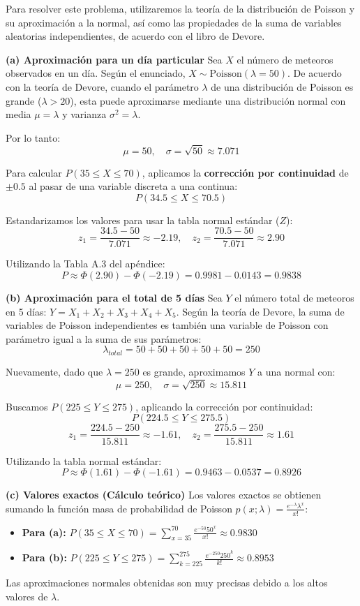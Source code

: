 \documentclass[a4paper]{article}
\begin{document}
Para resolver este problema, utilizaremos la teoría de la distribución de Poisson y su aproximación a la normal, así como las propiedades de la suma de variables aleatorias independientes, de acuerdo con el libro de Devore.

\textbf{(a) Aproximación para un día particular}
Sea $X$ el número de meteoros observados en un día. Según el enunciado, $X \sim \text{Poisson}(\lambda = 50)$. 
De acuerdo con la teoría de Devore, cuando el parámetro $\lambda$ de una distribución de Poisson es grande ($\lambda > 20$), esta puede aproximarse mediante una distribución normal con media $\mu = \lambda$ y varianza $\sigma^2 = \lambda$. 

Por lo tanto:
$$\mu = 50, \quad \sigma = \sqrt{50} \approx 7.071$$

Para calcular $P(35 \le X \le 70)$, aplicamos la \textbf{corrección por continuidad} de $\pm 0.5$ al pasar de una variable discreta a una continua:
$$P(34.5 \le X \le 70.5)$$

Estandarizamos los valores para usar la tabla normal estándar ($Z$):
$$z_1 = \frac{34.5 - 50}{7.071} \approx -2.19, \quad z_2 = \frac{70.5 - 50}{7.071} \approx 2.90$$

Utilizando la Tabla A.3 del apéndice:
$$P \approx \Phi(2.90) - \Phi(-2.19) = 0.9981 - 0.0143 = \mathbf{0.9838}$$

\textbf{(b) Aproximación para el total de 5 días}
Sea $Y$ el número total de meteoros en 5 días: $Y = X_1 + X_2 + X_3 + X_4 + X_5$.
Según la teoría de Devore, la suma de variables de Poisson independientes es también una variable de Poisson con parámetro igual a la suma de sus parámetros:
$$\lambda_{total} = 50 + 50 + 50 + 50 + 50 = 250$$

Nuevamente, dado que $\lambda = 250$ es grande, aproximamos $Y$ a una normal con:
$$\mu = 250, \quad \sigma = \sqrt{250} \approx 15.811$$

Buscamos $P(225 \le Y \le 275)$, aplicando la corrección por continuidad:
$$P(224.5 \le Y \le 275.5)$$
$$z_1 = \frac{224.5 - 250}{15.811} \approx -1.61, \quad z_2 = \frac{275.5 - 250}{15.811} \approx 1.61$$

Utilizando la tabla normal estándar:
$$P \approx \Phi(1.61) - \Phi(-1.61) = 0.9463 - 0.0537 = \mathbf{0.8926}$$

\textbf{(c) Valores exactos (Cálculo teórico)}
Los valores exactos se obtienen sumando la función masa de probabilidad de Poisson $p(x; \lambda) = \frac{e^{-\lambda} \lambda^x}{x!}$:

\begin{itemize}
    \item \textbf{Para (a):} $P(35 \le X \le 70) = \sum_{x=35}^{70} \frac{e^{-50} 50^x}{x!} \approx \mathbf{0.9830}$
    \item \textbf{Para (b):} $P(225 \le Y \le 275) = \sum_{k=225}^{275} \frac{e^{-250} 250^k}{k!} \approx \mathbf{0.8953}$
\end{itemize}
Las aproximaciones normales obtenidas son muy precisas debido a los altos valores de $\lambda$.
\end{document}
